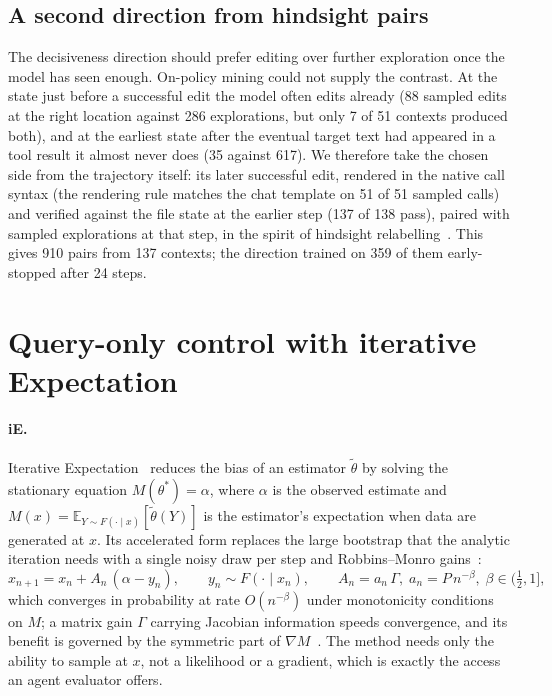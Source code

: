 \documentclass[11pt]{article}
\begin{document}
\subsection{A second direction from hindsight pairs}\label{sec:hindsight}

The decisiveness direction should prefer editing over further exploration once the model has seen enough. On-policy mining could not supply the contrast. At the state just before a successful edit the model often edits already (88 sampled edits at the right location against 286 explorations, but only 7 of 51 contexts produced both), and at the earliest state after the eventual target text had appeared in a tool result it almost never does (35 against 617). We therefore take the chosen side from the trajectory itself: its later successful edit, rendered in the native call syntax (the rendering rule matches the chat template on 51 of 51 sampled calls) and verified against the file state at the earlier step (137 of 138 pass), paired with sampled explorations at that step, in the spirit of hindsight relabelling~\citep{andrychowicz2017her}. This gives 910 pairs from 137 contexts; the direction trained on 359 of them early-stopped after 24 steps.

\section{Query-only control with iterative Expectation}\label{sec:control}

\paragraph{iE.} Iterative Expectation~\citep{qin2025ie} reduces the bias of an estimator $\tilde\theta$ by solving the stationary equation $M(\theta^\ast) = \alpha$, where $\alpha$ is the observed estimate and $M(x) = \mathbb{E}_{Y\sim F(\cdot\mid x)}[\tilde\theta(Y)]$ is the estimator's expectation when data are generated at $x$. Its accelerated form replaces the large bootstrap that the analytic iteration needs with a single noisy draw per step and Robbins--Monro gains~\citep{robbins1951sa}:
\begin{equation}
x_{n+1} = x_n + A_n\,(\alpha - y_n), \qquad y_n \sim F(\cdot\mid x_n), \qquad A_n = a_n\,\Gamma,\; a_n = P\,n^{-\beta},\; \beta\in(\tfrac12, 1],
\end{equation}
which converges in probability at rate $O(n^{-\beta})$ under monotonicity conditions on $M$; a matrix gain $\Gamma$ carrying Jacobian information speeds convergence, and its benefit is governed by the symmetric part of $\nabla M$~\citep{qin2025ie}. The method needs only the ability to sample at $x$, not a likelihood or a gradient, which is exactly the access an agent evaluator offers.
\end{document}
